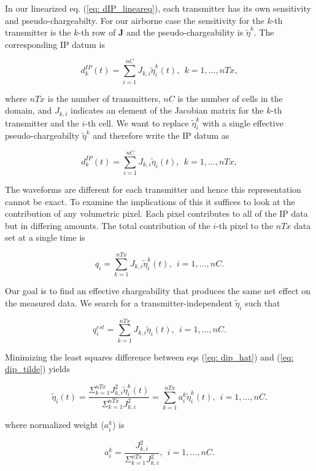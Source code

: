 \documentclass[letterpaper,11pt]{article}
\newcommand{\peta}{\tilde{\eta}}
\newcommand{\dip}{d^{IP}}
\begin{document}
In our linearized eq. (\ref{eq: dIP_lineareq}), each transmitter has its own sensitivity and pseudo-chargeabilty. For our airborne case the sensitivity for the $k$-th transmitter is the $k$-th row of $\mathbf{J}$ and the pseudo-chargeability is $\peta^k$. The corresponding  IP datum is 
\begin{linenomath*}
\begin{equation}
  \dip_k(t) = \sum_{i=1}^{nC}J_{k,i}\peta^k_i (t), \ \ k=1, \ldots, nTx,
  \label{eq: dip_kthTx}
\end{equation}
\end{linenomath*}
where $nTx$ is the number of transmitters, $nC$ is the number of cells in the domain, and $J_{k,i}$ indicates an element of the Jacobian matrix for the $k$-th transmitter and the $i$-th cell. We want to replace $\peta^k_i$ with a single effective pseudo-chargeabilty $\peta^k$ and therefore write the IP datum as 
\begin{linenomath*}
\begin{equation}
  \dip_k(t) = \sum_{i=1}^{nC}J_{k,i}\peta_i (t), \ \ k=1, \ldots, nTx,
  \label{eq: dipeff_kthTx}
\end{equation}
\end{linenomath*}
The waveforms are different for each transmitter and hence this representation cannot be exact. To examine the implications of this it suffices to look at the contribution of any volumetric pixel. Each pixel contributes to all of the IP data but in differing amounts. The total contribution of the  $i$-th pixel to the $nTx$ data set at a single time is  
\begin{linenomath*}
\begin{equation}
  q_i =\sum_{k=1}^{nTx} J_{k,i} \peta^k_i(t), \ \ i=1, \ldots, nC.
  \label{eq: dip_hat}
\end{equation}
\end{linenomath*}
Our goal is to find an effective chargeability that produces the same net effect on the measured data. We search for a transmitter-independent $\peta_i$ such that 
\begin{linenomath*}
\begin{equation}
  q_i^{est} =\sum_{k=1}^{nTx} J_{k,i} \peta_i(t), \ \ i=1, \ldots, nC.
  \label{eq: dip_tilde}
\end{equation}
\end{linenomath*}
Minimizing the least squares difference between eqs (\ref{eq: dip_hat}) and (\ref{eq: dip_tilde}) yields
\begin{linenomath*}
\begin{equation}
  \peta_i(t) = \frac {\Sigma_{k=1}^{nTx} J_{k,i}^2\peta^k_i(t)} {\Sigma_{k=1}^{nTx} J_{k,i}^2} = \sum_{k=1}^{nTx} a^k_i \peta^k_i(t), \ \ i=1, \ldots, nC.
  \label{eq: petaeff}
\end{equation}
\end{linenomath*}
where normalized weight ($a^k_i$) is 
\begin{linenomath*}
\begin{equation}
  a^k_i = \frac {J^2_{k,i}} {\Sigma_{k=1}^{nTx} J^2_{k,i}}, \ \ i=1, \ldots, nC.
  \label{eq: normalized_weights}
\end{equation}
\end{linenomath*}
\end{document}
